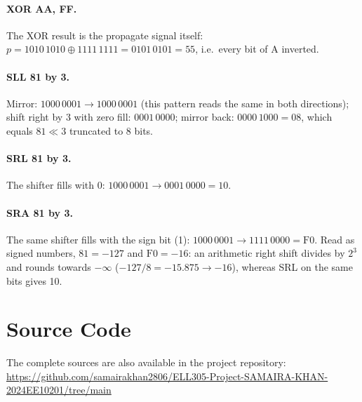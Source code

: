 \documentclass[12pt,a4paper,twoside]{article}
\newcommand{\repourl}{\url{https://github.com/samairakhan2806/ELL305-Project-SAMAIRA-KHAN-2024EE10201/tree/main}}
\begin{document}
\paragraph{XOR AA, FF.} The XOR result is the propagate signal itself:
$p = 1010\,1010 \oplus 1111\,1111 = 0101\,0101 = 55$, i.e.\ every bit of A inverted.

\paragraph{SLL 81 by 3.} Mirror: $1000\,0001 \to 1000\,0001$ (this pattern reads
the same in both directions); shift right by 3 with zero fill: $0001\,0000$;
mirror back: $0000\,1000 = 08$, which equals $81 \ll 3$ truncated to 8 bits.

\paragraph{SRL 81 by 3.} The shifter fills with 0:
$1000\,0001 \to 0001\,0000 = 10$.

\paragraph{SRA 81 by 3.} The same shifter fills with the sign bit (1):
$1000\,0001 \to 1111\,0000 = \mathrm{F0}$. Read as signed numbers, $81 = -127$ and
$\mathrm{F0} = -16$: an arithmetic right shift divides by $2^3$ and rounds towards
$-\infty$ ($-127/8 = -15.875 \to -16$), whereas SRL on the same bits gives 10.

\clearpage
\section{Source Code}
\label{app:code}

The complete sources are also available in the project repository:\\
\repourl
\end{document}
